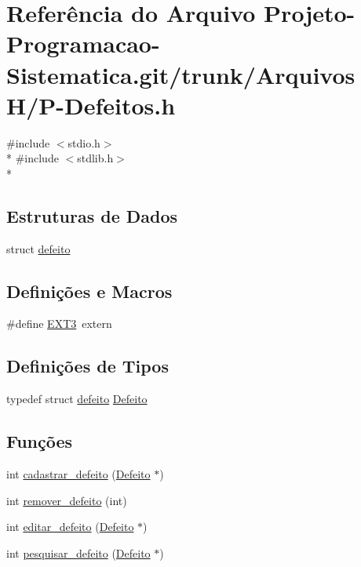 \hypertarget{_p-_defeitos_8h}{\section{Referência do Arquivo Projeto-\/\-Programacao-\/\-Sistematica.git/trunk/\-Arquivos H/\-P-\/\-Defeitos.h}
\label{_p-_defeitos_8h}
}
{\ttfamily \#include $<$stdio.\-h$>$}\\*
{\ttfamily \#include $<$stdlib.\-h$>$}\\*
\subsection*{Estruturas de Dados}
\begin{DoxyCompactItemize}
\item 
struct \hyperlink{structdefeito}{defeito}
\end{DoxyCompactItemize}
\subsection*{Definições e Macros}
\begin{DoxyCompactItemize}
\item 
\#define \hyperlink{_p-_defeitos_8h_ac39da83b60c64c028dc886f0e97f1d8d}{E\-X\-T3}~extern
\end{DoxyCompactItemize}
\subsection*{Definições de Tipos}
\begin{DoxyCompactItemize}
\item 
typedef struct \hyperlink{structdefeito}{defeito} \hyperlink{_p-_defeitos_8h_adedc13f79ae20c7142e1ec096aab90fe}{Defeito}
\end{DoxyCompactItemize}
\subsection*{Funções}
\begin{DoxyCompactItemize}
\item 
int \hyperlink{_p-_defeitos_8h_a78707920161355f8135075941602deec}{cadastrar\-\_\-defeito} (\hyperlink{_p-_defeitos_8h_adedc13f79ae20c7142e1ec096aab90fe}{Defeito} $\ast$)
\item 
int \hyperlink{_p-_defeitos_8h_a6b49bde5afaa267ec57585d3b70fe7c0}{remover\-\_\-defeito} (int)
\item 
int \hyperlink{_p-_defeitos_8h_a3a93effc1e2b01c1b7a3f37ad0110225}{editar\-\_\-defeito} (\hyperlink{_p-_defeitos_8h_adedc13f79ae20c7142e1ec096aab90fe}{Defeito} $\ast$)
\item 
int \hyperlink{_p-_defeitos_8h_a70a677897b0bee9bf9e1226865411ff3}{pesquisar\-\_\-defeito} (\hyperlink{_p-_defeitos_8h_adedc13f79ae20c7142e1ec096aab90fe}{Defeito} $\ast$)
\end{DoxyCompactItemize}


